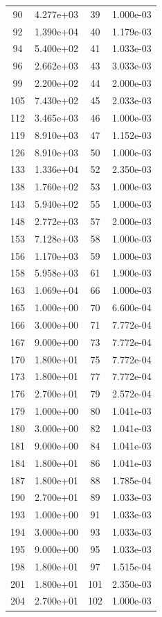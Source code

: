 \documentclass[12pt]{article}
\begin{document}
\begin{longtable}{@{}cccc@{}}
90 & 4.277e+03 & 39 & 1.000e-03 \\
92 & 1.390e+04 & 40 & 1.179e-03 \\
94 & 5.400e+02 & 41 & 1.033e-03 \\
96 & 2.662e+03 & 43 & 3.033e-03 \\
99 & 2.200e+02 & 44 & 2.000e-03 \\
105 & 7.430e+02 & 45 & 2.033e-03 \\
112 & 3.465e+03 & 46 & 1.000e-03 \\
119 & 8.910e+03 & 47 & 1.152e-03 \\
126 & 8.910e+03 & 50 & 1.000e-03 \\
133 & 1.336e+04 & 52 & 2.350e-03 \\
138 & 1.760e+02 & 53 & 1.000e-03 \\
143 & 5.940e+02 & 55 & 1.000e-03 \\
148 & 2.772e+03 & 57 & 2.000e-03 \\
153 & 7.128e+03 & 58 & 1.000e-03 \\
156 & 1.170e+03 & 59 & 1.000e-03 \\
158 & 5.958e+03 & 61 & 1.900e-03 \\
163 & 1.069e+04 & 66 & 1.000e-03 \\
165 & 1.000e+00 & 70 & 6.600e-04 \\
166 & 3.000e+00 & 71 & 7.772e-04 \\
167 & 9.000e+00 & 73 & 7.772e-04 \\
170 & 1.800e+01 & 75 & 7.772e-04 \\
173 & 1.800e+01 & 77 & 7.772e-04 \\
176 & 2.700e+01 & 79 & 2.572e-04 \\
179 & 1.000e+00 & 80 & 1.041e-03 \\
180 & 3.000e+00 & 82 & 1.041e-03 \\
181 & 9.000e+00 & 84 & 1.041e-03 \\
184 & 1.800e+01 & 86 & 1.041e-03 \\
187 & 1.800e+01 & 88 & 1.785e-04 \\
190 & 2.700e+01 & 89 & 1.033e-03 \\
193 & 1.000e+00 & 91 & 1.033e-03 \\
194 & 3.000e+00 & 93 & 1.033e-03 \\
195 & 9.000e+00 & 95 & 1.033e-03 \\
198 & 1.800e+01 & 97 & 1.515e-04 \\
201 & 1.800e+01 & 101 & 2.350e-03 \\
204 & 2.700e+01 & 102 & 1.000e-03 \\

\end{longtable}
\end{document}
